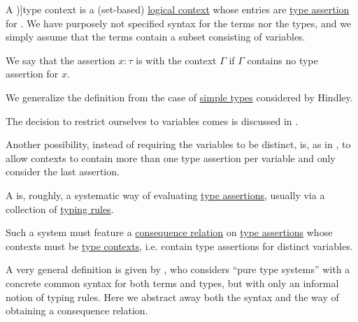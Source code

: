 \begin{definition}\label{def:type_context}
  A \term[en=type-context (\cite[def. 2A5]{Hindley1997BasicSTT})]{type context} is a (set-based) \hyperref[def:logical_context]{logical context} whose entries are \hyperref[def:type_assertion]{type assertion} for . We have purposely not specified syntax for the terms nor the types, and we simply assume that the terms contain a subset consisting of variables.

  We say that the assertion \( x: \tau \) is  with the context \( \Gamma \) if \( \Gamma \) contains no type assertion for \( x \).
\end{definition}
\begin{comments}
  \item We generalize the definition from the case of \hyperref[def:simple_type]{simple types} considered by Hindley.

  \item The decision to restrict ourselves to variables comes is discussed in .

  \item Another possibility, instead of requiring the variables to be distinct, is, as in \cite[159]{Mimram2020ProgramEqualsProof}, to allow contexts to contain more than one type assertion per variable and only consider the last assertion.
\end{comments}

\begin{definition}\label{def:abstract_type_system}\mimprovised
  A  is, roughly, a systematic way of evaluating \hyperref[def:type_assertion]{type assertions}, usually via a collection of \hyperref[con:typing_rule]{typing rules}.

  Such a system must feature a \hyperref[def:consequence_relation]{consequence relation} on \hyperref[def:type_assertion]{type assertions} whose contexts must be \hyperref[def:type_context]{type contexts}, i.e. contain type assertions for distinct variables.
\end{definition}
\begin{comments}
  \item A very general definition is given by , who considers \enquote{pure type systems} with a concrete common syntax for both terms and types, but with only an informal notion of typing rules. Here we abstract away both the syntax and the way of obtaining a consequence relation.
\end{comments}


